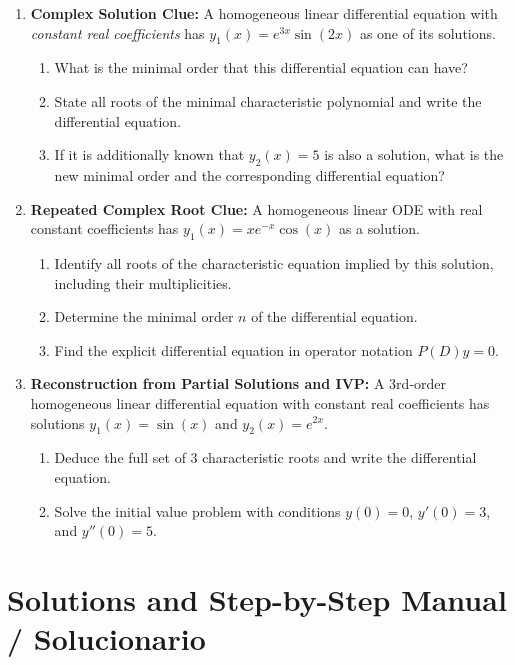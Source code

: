 \documentclass[11pt,letterpaper]{article}
\begin{document}
\begin{enumerate}[label=\textbf{Problem \arabic*:}, leftmargin=*]
    \item \textbf{Complex Solution Clue:} A homogeneous linear differential equation with \textit{constant real coefficients} has $y_1(x) = e^{3x} \sin(2x)$ as one of its solutions.
    \begin{enumerate}[label=(\alph*)]
        \item What is the minimal order that this differential equation can have?
        \item State all roots of the minimal characteristic polynomial and write the differential equation.
        \item If it is additionally known that $y_2(x) = 5$ is also a solution, what is the new minimal order and the corresponding differential equation?
    \end{enumerate}

    \item \textbf{Repeated Complex Root Clue:} A homogeneous linear ODE with real constant coefficients has $y_1(x) = x e^{-x} \cos(x)$ as a solution.
    \begin{enumerate}[label=(\alph*)]
        \item Identify all roots of the characteristic equation implied by this solution, including their multiplicities.
        \item Determine the minimal order $n$ of the differential equation.
        \item Find the explicit differential equation in operator notation $P(D)y = 0$.
    \end{enumerate}

    \item \textbf{Reconstruction from Partial Solutions and IVP:} 
    A 3rd-order homogeneous linear differential equation with constant real coefficients has solutions $y_1(x) = \sin(x)$ and $y_2(x) = e^{2x}$.
    \begin{enumerate}[label=(\alph*)]
        \item Deduce the full set of 3 characteristic roots and write the differential equation.
        \item Solve the initial value problem with conditions $y(0) = 0$, $y'(0) = 3$, and $y''(0) = 5$.
    \end{enumerate}
\end{enumerate}

\newpage
\section{Solutions and Step-by-Step Manual / Solucionario}
\end{document}
